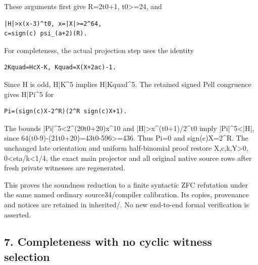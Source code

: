 These arguments first give R=\allowbreak{}2t0+\allowbreak{}1, t0\textgreater{}\allowbreak{}=\allowbreak{}24, and



\begin{verbatim}
|H|>x(x-3)^t0, x=|X|>=2^64,
c=sign(c) psi_(a+2)(R).
\end{verbatim}

For completeness, the actual projection step uses the identity



\begin{verbatim}
2Kquad=HcX-K, Kquad=X(X+2ac)-1.
\end{verbatim}

Since H is odd, H|K\textasciicircum{}\allowbreak{}5 implies H|Kquad\textasciicircum{}\allowbreak{}5. The retained signed Pell congruence gives H|Pi\textasciicircum{}\allowbreak{}5 for



\begin{verbatim}
Pi=(sign(c)X-2^R)(2^R sign(c)X+1).
\end{verbatim}

The bounds |Pi|\textasciicircum{}\allowbreak{}5\textless{}\allowbreak{}2\textasciicircum{}\allowbreak{}(20t0+\allowbreak{}20)x\textasciicircum{}\allowbreak{}10 and |H|\textgreater{}\allowbreak{}x\textasciicircum{}\allowbreak{}(t0+\allowbreak{}1)/\allowbreak{}2\textasciicircum{}\allowbreak{}t0 imply |Pi|\textasciicircum{}\allowbreak{}5\textless{}\allowbreak{}|H|, since 64(t0-9)-(21t0+\allowbreak{}20)=\allowbreak{}43t0-596\textgreater{}\allowbreak{}=\allowbreak{}436. Thus Pi=\allowbreak{}0 and sign(c)X=\allowbreak{}2\textasciicircum{}\allowbreak{}R. The unchanged late orientation and uniform half-binomial proof restore X,c,k,Y\textgreater{}\allowbreak{}0, 0\textless{}\allowbreak{}eta/\allowbreak{}k\textless{}\allowbreak{}1/\allowbreak{}4, the exact main projector and all original native source rows after fresh private witnesses are regenerated.



This proves the soundness reduction to a finite syntactic ZFC refutation under the same named ordinary source34/\allowbreak{}compiler calibration. Its copies, provenance and notices are retained in inherited/. No new end-to-end formal verification is asserted.



\subsection{7. Completeness with no cyclic witness selection}



